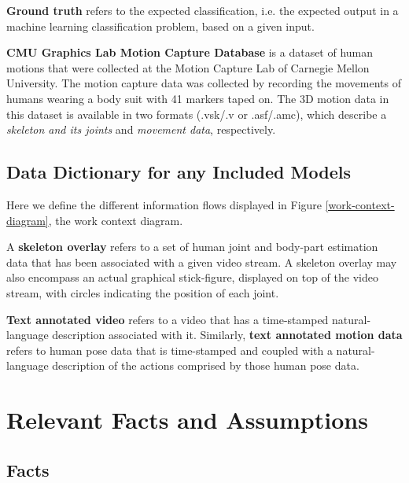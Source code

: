 \documentclass{scrreprt}
\begin{document}
\textbf{Ground truth} refers to the expected classification, i.e. the expected
output in a machine learning classification problem, based on a given input.

\textbf{CMU Graphics Lab Motion Capture Database} is a dataset of human motions
that were collected at the Motion Capture Lab of Carnegie Mellon University.
The motion capture data was collected by recording the movements of humans
wearing a body suit with 41 markers taped on. The 3D motion data in this
dataset is available in two formats (.vsk/.v or .asf/.amc), which describe a
\textit{skeleton and its joints} and \textit{movement data}, respectively.

\subsection{Data Dictionary for any Included Models}

Here we define the different information flows displayed in Figure
\ref{work-context-diagram}, the work context diagram.

A \textbf{skeleton overlay} refers to a set of human joint and body-part
estimation data that has been associated with a given video stream. A skeleton
overlay may also encompass an actual graphical stick-figure, displayed on top
of the video stream, with circles indicating the position of each joint.

\textbf{Text annotated video} refers to a video that has a time-stamped
natural-language description associated with it. Similarly, \textbf{text
annotated motion data} refers to human pose data that is time-stamped and
coupled with a natural-language description of the actions comprised by those
human pose data.

\section{Relevant Facts and Assumptions}

\subsection{Facts}
\end{document}
